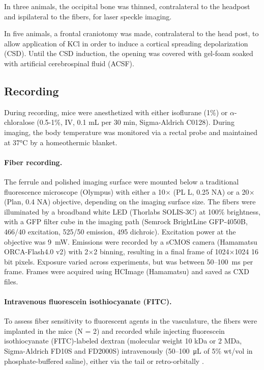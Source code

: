 In three animals, the occipital bone 
was thinned, contralateral to the headpost and ispilateral to the 
fibers, for laser speckle imaging.

In five animals, a frontal craniotomy was made, contralateral to 
the head post, to allow application of KCl in order to induce a 
cortical spreading depolarization (CSD). Until the CSD induction, the 
opening was covered with gel-foam soaked with artificial 
cerebrospinal fluid (ACSF).

\subsection{Recording}

During recording, mice were anesthetized with either isoflurane (1\%) 
or $\alpha$-chloralose (0.5-1\%, IV, 0.1 \si{\milli\liter} per 30 min, 
Sigma-Aldrich C0128). During imaging, the body 
temperature was monitored via a rectal probe and maintained at 
37\si{\celsius} by a homeothermic blanket.


\paragraph{Fiber recording.} The ferrule and polished imaging surface were mounted
 below a traditional fluorescence microscope (Olympus) with either a 
10$\times$ (PL L, 0.25 NA) or a 20$\times$ (Plan, 0.4 NA) objective, 
depending on the imaging surface size. The fibers were illuminated by 
a broadband white LED (Thorlabs SOLIS-3C) at 100\% brightness, with a 
GFP filter cube in the imaging path (Semrock BrightLine GFP-4050B, 
466/40 excitation, 525/50 emission, 495 dichroic). Excitation power at
 the objective was 9~\si{\milli\watt}. Emissions were recorded by a 
sCMOS camera (Hamamatsu ORCA-Flash4.0 v2) with 2$\times$2 binning, 
resulting in a final frame of 1024$\times$1024 16 bit pixels. Exposure
 varied across experiments, but was between 50--100~ms per frame. 
Frames were acquired using HCImage (Hamamatsu) and saved as CXD files.



\paragraph{Intravenous fluorescein isothiocyanate (FITC).} To assess fiber sensitivity to 
fluorescent agents in the vasculature, the fibers were implanted in 
the mice (N = 2) and recorded while injecting fluorescein 
isothiocyanate (FITC)-labeled dextran (molecular weight 10 kDa or 2 
MDa, Sigma-Aldrich FD10S and FD2000S) intravenously 
(50--100~\si{\micro\liter} of 5\% wt/vol in phosphate-buffered 
saline), either via the tail or retro-orbitally \cite{Yardeni:2011fs}.



